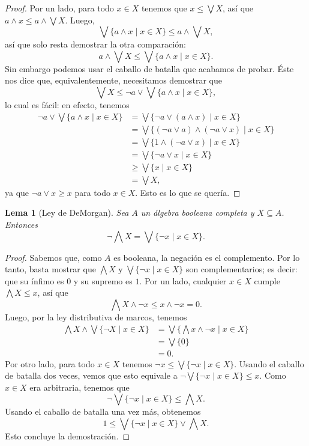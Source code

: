 \documentclass[12pt,letterpaper,titlepage]{article}
\newtheorem{lemma}{Lema}
\theoremstyle{definition}
\renewcommand\sup{\vee}
\newcommand\Sup{\bigvee}
\renewcommand\inf{\wedge}
\newcommand\Inf{\bigwedge}
\newcommand\<{\langle}
\renewcommand\>{\rangle}
\begin{document}
\begin{proof}
    Por un lado, para todo $x\in X$ tenemos que $x\leq\Sup X$, así que
    $a\inf x\leq a\inf\Sup X$.
    Luego,
    \[
        \Sup\{a\inf x\mid x\in X\} \leq a\inf\Sup X
    ,\]
    así que solo resta demostrar la otra comparación:
    \[
        a\inf\Sup X \leq \Sup\{a\inf x\mid x\in X\}
    .\]
    Sin embargo podemos usar el caballo de batalla que acabamos de probar.
    Éste nos dice que, equivalentemente, necesitamos demostrar que
    \[
        \Sup X \leq \neg a\sup \Sup\{a\inf x\mid x\in X\}
    ,\]
    lo cual es fácil: en efecto, tenemos
    \begin{align*}
        \neg a\sup\Sup\{a\inf x\mid x\in X\}
        &= \Sup\{\neg a \sup(a\inf x) \mid x\in X\} \\
        &= \Sup\{(\neg a\sup a)\inf(\neg a\sup x) \mid x\in X\} \\
        &= \Sup\{1\inf(\neg a\sup x) \mid x\in X\} \\
        &= \Sup\{\neg a\sup x \mid x\in X\} \\
        &\geq \Sup\{x \mid x\in X\} \\
        &= \Sup X,
    \end{align*}
    ya que $\neg a\sup x\geq x$ para todo $x\in X$.
    Esto es lo que se quería.
\end{proof}
\begin{lemma}[Ley de DeMorgan]
  Sea $A$ un álgebra booleana completa y $X\subseteq A$.
  Entonces
  \[
    \neg \Inf X = \Sup \{\neg x \mid x\in X\}
  .\]
\end{lemma}
\begin{proof}
    Sabemos que, como $A$ es booleana, la negación es el complemento.
    Por lo tanto, basta mostrar que
    $\Inf X$ y $\Sup \{\neg x \mid x\in X\}$ son complementarios;
    es decir: que su ínfimo es $0$ y su supremo es $1$.
    Por un lado, cualquier $x\in X$ cumple $\Inf X\leq x$, así que
    \[
        \Inf X\inf\neg x \leq x\inf \neg x = 0.
    \]
    Luego, por la ley distributiva de marcos, tenemos
    \begin{align*}
        \Inf X \inf \Sup\{\neg X\mid x\in X\}
        &= \Sup\{\Inf x \inf \neg x\mid x\in X\} \\
        &= \Sup\{0\} \\
        &= 0.
    \end{align*}
    Por otro lado, para todo $x\in X$ tenemos
    $\neg x\leq \Sup\{\neg x\mid x\in X\}$.
    Usando el caballo de batalla dos veces, vemos que esto equivale a
    $\neg\Sup\{\neg x\mid x\in X\}\leq x$.
    Como $x\in X$ era arbitraria, tenemos que
    \[
        \neg\Sup\{\neg x\mid x\in X\}\leq \Inf X
    .\]
    Usando el caballo de batalla una vez más, obtenemos
    \[
        1\leq \Sup\{\neg x\mid x\in X\} \sup \Inf X
    .\]
    Esto concluye la demostración.
\end{proof}
\end{document}
